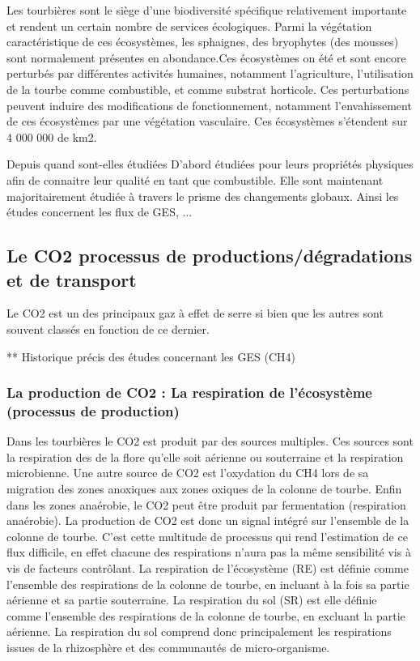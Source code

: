 Les tourbières sont le siège d'une biodiversité spécifique relativement importante et rendent un certain nombre de services écologiques.
Parmi la végétation caractéristique de ces écosystèmes, les sphaignes, des bryophytes (des mousses) sont normalement présentes en abondance.Ces écosystèmes on été et sont encore perturbés par différentes activités humaines, notamment l'agriculture, l'utilisation de la tourbe comme combustible, et comme substrat horticole.
Ces perturbations peuvent induire des modifications de fonctionnement, notamment l'envahissement de ces écosystèmes par une végétation vasculaire.
Ces écosystèmes s'étendent sur 4 000 000 de km2.

Depuis quand sont-elles étudiées
D'abord étudiées pour leurs propriétés physiques afin de connaitre leur qualité en tant que combustible.
Elle sont maintenant majoritairement étudiée à travers le prisme des changements globaux.
Ainsi les études concernent les flux de GES, ...

\subsection{Le CO2 processus de productions/dégradations et de transport}
Le CO2 est un des principaux gaz à effet de serre si bien que les autres sont souvent classés en fonction de ce dernier.

** Historique précis des études concernant les GES (CH4)

\subsubsection{La production de CO2 : La respiration de l'écosystème (processus de production)}
Dans les tourbières le CO2 est produit par des sources multiples.
Ces sources sont la respiration des de la flore qu'elle soit aérienne ou souterraine et la respiration microbienne.
Une autre source de CO2 est l'oxydation du CH4 lors de sa migration des zones anoxiques aux zones oxiques de la colonne de tourbe.
Enfin dans les zones anaérobie, le CO2 peut être produit par fermentation (respiration anaérobie).
La production de CO2 est donc un signal intégré sur l'ensemble de la colonne de tourbe. 
C'est cette multitude de processus qui rend l'estimation de ce flux difficile, en effet chacune des respirations n'aura pas la même sensibilité vis à vis de facteurs contrôlant.
La respiration de l'écosystème (RE) est définie comme l'ensemble des respirations de la colonne de tourbe, en incluant à la fois sa partie aérienne et sa partie souterraine.
La respiration du sol (SR) est elle définie comme l'ensemble des respirations de la colonne de tourbe, en excluant la partie aérienne.
La respiration du sol comprend donc principalement les respirations issues de la rhizosphère et des communautés de micro-organisme.

